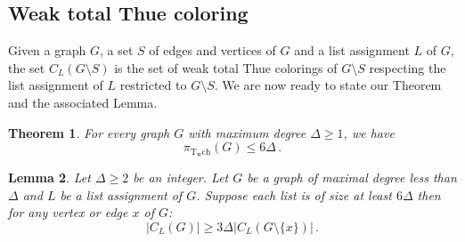 \documentclass[a4paper,10pt]{article}
\newtheorem{theorem}{Theorem}
\newtheorem{lemma}[theorem]{Lemma}
\begin{document}
\subsection{Weak total Thue coloring}\label{sectionwttc}
Given a graph $G$, a set $S$ of edges and vertices of $G$ and a list assignment $L$ of $G$, the set $C_L(G\setminus S)$ is the set of weak total Thue colorings of $G\setminus S$ respecting the list assignment of $L$ restricted to $G\setminus S$.
We are now ready to state our Theorem and the associated Lemma.
\begin{theorem}\label{weaktotalthuecoloringthm}
 For every graph $G$ with maximum degree $\Delta\ge1$, we have
 $$\pi_{\operatorname{T_wch}}(G)\le6\Delta\,.$$ 
\end{theorem}
\begin{lemma}\label{weaktotalthuelemma}
Let $\Delta\ge2$ be an integer.
Let $G$ be a graph of maximal degree less than $\Delta$ and $L$ be a list assignment of $G$.
Suppose each list is of size at least $6\Delta$
then for any vertex or edge $x$ of $G$:
 $$|C_L(G)|\ge 3\Delta|C_L(G\setminus\{x\})|\,.$$
\end{lemma}
\end{document}
